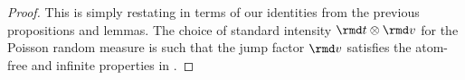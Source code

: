 \begin{proof}
  \label{proof:theorem:jump-diffusion-characterizations}
  This is simply restating \cite[Theorems II.2.42, II.2.49, and III.2.26]{jacod2003} in terms of our identities from the previous propositions and lemmas.
  The choice of standard intensity $\rmd t \otimes \rmd\markVar$ for the Poisson random measure is such that the jump factor $\rmd\markVar$ satisfies the atom-free and infinite properties in \cite[Remark III.2.28(3)]{jacod2003}.
\end{proof}
